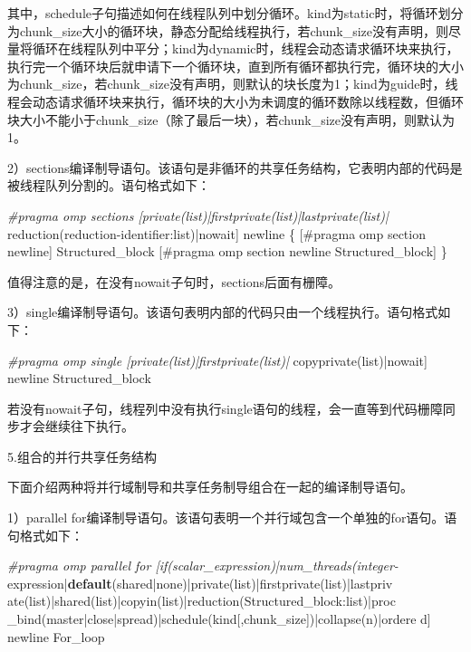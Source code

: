 \documentclass[]{ctexbook}
\newenvironment{Shaded}{\begin{snugshade}}{\end{snugshade}}
\newcommand{\ControlFlowTok}[1]{\textcolor[rgb]{0.13,0.29,0.53}{\textbf{#1}}}
\newcommand{\NormalTok}[1]{#1}
\newcommand{\PreprocessorTok}[1]{\textcolor[rgb]{0.56,0.35,0.01}{\textit{#1}}}
\begin{document}
其中，schedule子句描述如何在线程队列中划分循环。kind为static时，将循环划分为chunk\_size大小的循环块，静态分配给线程执行，若chunk\_size没有声明，则尽量将循环在线程队列中平分；kind为dynamic时，线程会动态请求循环块来执行，执行完一个循环块后就申请下一个循环块，直到所有循环都执行完，循环块的大小为chunk\_size，若chunk\_size没有声明，则默认的块长度为1；kind为guide时，线程会动态请求循环块来执行，循环块的大小为未调度的循环数除以线程数，但循环块大小不能小于chunk\_size（除了最后一块），若chunk\_size没有声明，则默认为1。

2）sections编译制导语句。该语句是非循环的共享任务结构，它表明内部的代码是被线程队列分割的。语句格式如下：

\begin{Shaded}
\begin{Highlighting}[]
\PreprocessorTok{\#pragma omp sections [private(list)|firstprivate(list)|lastprivate(list)|}
\NormalTok{reduction(reduction{-}identifier:list)|nowait] }
\NormalTok{newline}
\NormalTok{\{}
\NormalTok{    [\#pragma omp section newline]}
\NormalTok{       Structured\_block}
\NormalTok{    [\#pragma omp section newline}
\NormalTok{       Structured\_block]}
\NormalTok{\}}
\end{Highlighting}
\end{Shaded}

值得注意的是，在没有nowait子句时，sections后面有栅障。

3）single编译制导语句。该语句表明内部的代码只由一个线程执行。语句格式如下：

\begin{Shaded}
\begin{Highlighting}[]
\PreprocessorTok{\#pragma omp single [private(list)|firstprivate(list)| }
\NormalTok{copyprivate(list)|nowait] newline}
\NormalTok{Structured\_block}
\end{Highlighting}
\end{Shaded}

若没有nowait子句，线程列中没有执行single语句的线程，会一直等到代码栅障同步才会继续往下执行。

5.组合的并行共享任务结构

下面介绍两种将并行域制导和共享任务制导组合在一起的编译制导语句。

1）parallel for编译制导语句。该语句表明一个并行域包含一个单独的for语句。语句格式如下：

\begin{Shaded}
\begin{Highlighting}[]
\PreprocessorTok{\#pragma omp parallel for [if(scalar\_expression)|num\_threads(integer{-}}
\NormalTok{expression|}\ControlFlowTok{default}\NormalTok{(shared|none)|private(list)|firstprivate(list)|lastpriv}
\NormalTok{ate(list)|shared(list)|copyin(list)|reduction(Structured\_block:list)|proc}
\NormalTok{\_bind(master|close|spread)|schedule(kind[,chunk\_size])|collapse(n)|ordere}
\NormalTok{d]}
\NormalTok{newline}
\NormalTok{For\_loop}
\end{Highlighting}
\end{Shaded}
\end{document}
